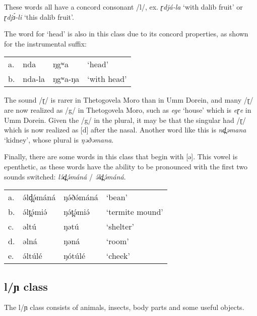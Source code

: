 These words all have a concord consonant /l/, ex. \textit{ɽdjá-la} ‘with dalib fruit’ or \textit{ɽdjɜ́-li} ‘this dalib fruit’.

The word for ‘head’ is also in this class due to its concord properties, as shown for the instrumental suffix:

\ea	
\begin{tabular}[t]{llll}
a.	&	nda		&	ŋgʷa	&	‘head’\\ 
b.	&	nda-la	&	ŋgʷa-ŋa	&	‘with head’\\
\end{tabular}
\z

The sound /ɽ/ is rarer in Thetogovela Moro than in Umm Dorein, and many /ɽ/ are now realized as /g/ in Thetogovela Moro, such as \textit{ege} ‘house’ which is \textit{eɽe} in Umm Dorein. Given the /g/ in the plural, it may be that the singular had /ɽ/ which is now realized as [d] after the nasal. Another word like this is \textit{nd̪əmana} ‘kidney’, whose plural is \textit{ŋəðəmana}. %

Finally, there are some words in this class that begin with [ə]. This vowel is epenthetic, as these words have the ability to be pronounced with the first two sounds switched: \textit{lə́d̪ə́máná} / \textit{ə́ld̪ə́máná}. 

\ea	
\begin{tabular}[t]{llll}
a.	&	ə́ld̪ə́máná	&	ŋə́ðə́máná	&	‘bean’ \\
b.	&	ə́lt̪ə́miə́	&	ŋə́t̪ə́miə́	&	‘termite mound’\\
c.	&	əltú	&	ŋətú	&	‘shelter’\\
d.	&	əlná	&	ŋəná	&	‘room’\\
e.	&	ə́ltúlé	&	ŋótúlé	&	‘cheek’\\
\end{tabular}
\z

\subsection{l/ɲ class}
The l/ɲ class consists of animals, insects, body parts and some useful objects. 

